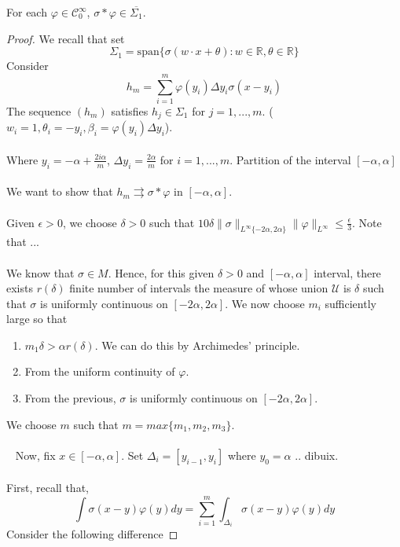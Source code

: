\documentclass[../main.tex]{subfiles}
\begin{document}
	\begin{lema} %
		For each $\varphi \in  \mathcal{C}^\infty_0$, $ \sigma \ast \varphi \in  \overline{\Sigma_1}$. 
		
	\end{lema}
	
	\begin{proof} %
		We recall that set 
		\begin{equation}
			\Sigma_1 = \text{span} \{ {\sigma(w\cdot x + \theta) : w\in \mathbb{R}, \theta \in \mathbb{R} \} } 
			\tag{1}
		\end{equation}
		Consider $$h_m= \sum_{i=1}^m\varphi(y_i)\Delta y_i \sigma(x-y_i)$$ 
		The sequence $(h_m)$ satisfies $h_j\in \Sigma_1$ for $j=1,...,m$. ($w_i=1,\theta_i=-y_i, \beta_i=\varphi(y_i)\Delta y_i$).\\ \\ 
		Where $y_i=-\alpha + \frac{2i\alpha}{m}$, $\Delta y_i=\frac{2\alpha}{m}$ for $i=1,...,m$. Partition of the interval $[-\alpha,\alpha]$ \\ \\ We want to show that $h_m \rightrightarrows \sigma \ast \varphi $ in $[-\alpha,\alpha]$.  \\ \\
		Given $\epsilon >0$, we choose $\delta >0$ such that $10\delta \| \sigma\|_{L^\infty\{-2\alpha,2\alpha\}}\|\varphi \|_{L^\infty} \leq \frac{\epsilon}{3}$. Note that ... \\ \\ 
		We know that $\sigma \in M$. Hence, for this given $\delta>0$ and $[-\alpha,\alpha]$ interval, there exists $r(\delta)$ finite number of intervals the measure of whose union $\mathscr{U}$ is $\delta$ such that $\sigma$ is uniformly continuous on $[-2\alpha,2\alpha]$. We now choose $m_i$ sufficiently large so that
		\begin{enumerate}
			\item $m_1 \delta > \alpha r(\delta)$. We can do this by Archimedes' principle.
			\item From the uniform continuity of $\varphi$.
			\item From the previous, $\sigma$ is uniformly continuous on  $[-2\alpha,2\alpha]$. 
		\end{enumerate}
		We choose $m$ such that $m=max\{m_1,m_2,m_3\}$. \\ \\ 
		Now, fix $x\in [-\alpha,\alpha] $. Set $\Delta_i= [y_{i-1},y_i]$ where $y_0= \alpha$ .. dibuix. \\ \\
		First, recall that,\\
		$$\int \sigma(x-y)\varphi(y)dy = \sum_{i=1}^m \int_{\Delta_i}\sigma(x-y)\varphi(y)dy$$
		Consider the following difference 


\end{proof}
\end{document}
